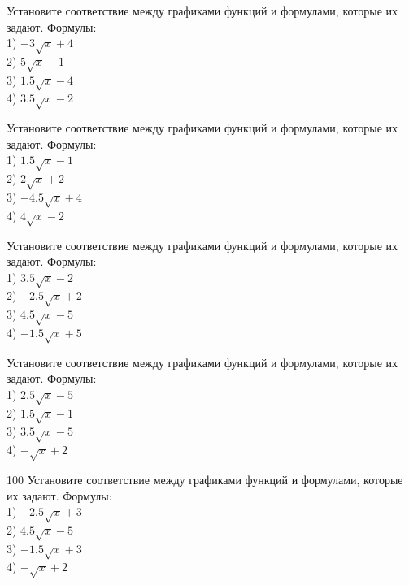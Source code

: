 \documentclass[4apaper]{article}
\begin{document}
\begin{taskBN}{96}
Установите соответствие между графиками функций и формулами, которые их задают. Формулы: \\1) $-3\sqrt{x}+4$\\2) $5\sqrt{x}-1$\\3) $1.5\sqrt{x}-4$\\4) $3.5\sqrt{x}-2$
\end{taskBN}

\begin{taskBN}{97}
Установите соответствие между графиками функций и формулами, которые их задают. Формулы: \\1) $1.5\sqrt{x}-1$\\2) $2\sqrt{x}+2$\\3) $-4.5\sqrt{x}+4$\\4) $4\sqrt{x}-2$
\end{taskBN}

\begin{taskBN}{98}
Установите соответствие между графиками функций и формулами, которые их задают. Формулы: \\1) $3.5\sqrt{x}-2$\\2) $-2.5\sqrt{x}+2$\\3) $4.5\sqrt{x}-5$\\4) $-1.5\sqrt{x}+5$
\end{taskBN}

\begin{taskBN}{99}
Установите соответствие между графиками функций и формулами, которые их задают. Формулы: \\1) $2.5\sqrt{x}-5$\\2) $1.5\sqrt{x}-1$\\3) $3.5\sqrt{x}-5$\\4) $-\sqrt{x}+2$
\end{taskBN}

\begin{taskBN}{100}
Установите соответствие между графиками функций и формулами, которые их задают. Формулы: \\1) $-2.5\sqrt{x}+3$\\2) $4.5\sqrt{x}-5$\\3) $-1.5\sqrt{x}+3$\\4) $-\sqrt{x}+2$
\end{taskBN}
\end{document}

